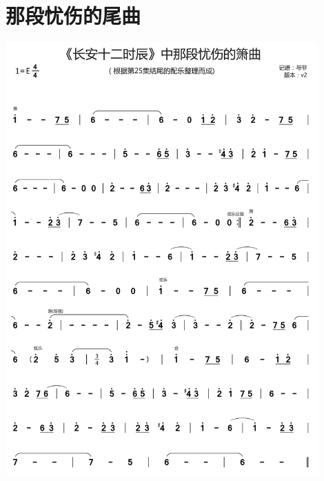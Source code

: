 \documentclass[cn,pad,twocol]{elegantbook}
\begin{document}
\section{那段忧伤的尾曲}        \includegraphics[width=0.9\textwidth]{rpi400/20210127长安十二时辰25集尾曲.jpg}
\end{document}
